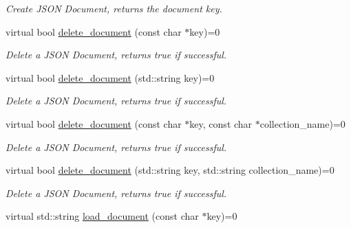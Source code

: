 \begin{DoxyCompactItemize}
\begin{DoxyCompactList}\small\item\em Create J\-S\-O\-N Document, returns the document key. \end{DoxyCompactList}\item 
\hypertarget{classMongoInterface_ad93f560578eefc109b2e4e9281af7d59}{virtual bool \hyperlink{classMongoInterface_ad93f560578eefc109b2e4e9281af7d59}{delete\-\_\-document} (const char $\ast$key)=0}\label{classMongoInterface_ad93f560578eefc109b2e4e9281af7d59}

\begin{DoxyCompactList}\small\item\em Delete a J\-S\-O\-N Document, returns true if successful. \end{DoxyCompactList}\item 
\hypertarget{classMongoInterface_ab0effcef0cfff3a52158b521d66631c3}{virtual bool \hyperlink{classMongoInterface_ab0effcef0cfff3a52158b521d66631c3}{delete\-\_\-document} (std\-::string key)=0}\label{classMongoInterface_ab0effcef0cfff3a52158b521d66631c3}

\begin{DoxyCompactList}\small\item\em Delete a J\-S\-O\-N Document, returns true if successful. \end{DoxyCompactList}\item 
\hypertarget{classMongoInterface_a5d320b74a1886fff5d69e247709da486}{virtual bool \hyperlink{classMongoInterface_a5d320b74a1886fff5d69e247709da486}{delete\-\_\-document} (const char $\ast$key, const char $\ast$collection\-\_\-name)=0}\label{classMongoInterface_a5d320b74a1886fff5d69e247709da486}

\begin{DoxyCompactList}\small\item\em Delete a J\-S\-O\-N Document, returns true if successful. \end{DoxyCompactList}\item 
\hypertarget{classMongoInterface_aff0b6d8615e39454a1402d746d0a0f71}{virtual bool \hyperlink{classMongoInterface_aff0b6d8615e39454a1402d746d0a0f71}{delete\-\_\-document} (std\-::string key, std\-::string collection\-\_\-name)=0}\label{classMongoInterface_aff0b6d8615e39454a1402d746d0a0f71}

\begin{DoxyCompactList}\small\item\em Delete a J\-S\-O\-N Document, returns true if successful. \end{DoxyCompactList}\item 
\hypertarget{classMongoInterface_aab91aac01e7c536b63517cbc630bca10}{virtual std\-::string \hyperlink{classMongoInterface_aab91aac01e7c536b63517cbc630bca10}{load\-\_\-document} (const char $\ast$key)=0}\label{classMongoInterface_aab91aac01e7c536b63517cbc630bca10}


\end{DoxyCompactItemize}
